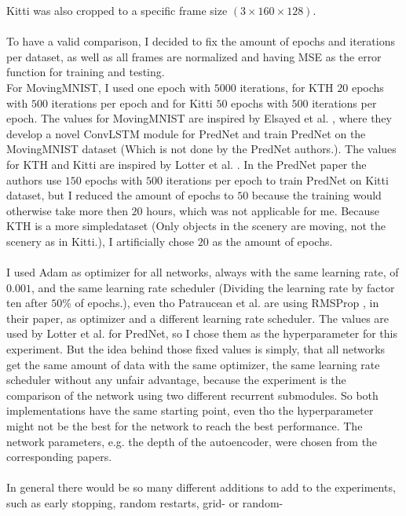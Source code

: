  Kitti was also cropped to a specific frame size $(3 \times 160 \times 128)$.\\\\
  To have a valid comparison, I decided to fix the amount of epochs and iterations per dataset, as well as all frames are normalized and having MSE as the
  error function for training and testing.\\
  For MovingMNIST, I used one epoch with $5000$ iterations, for KTH $20$ epochs with $500$ iterations per epoch and for Kitti $50$ epochs with $500$ iterations
  per epoch. The values for MovingMNIST are inspired by Elsayed et al. \cite{Elsayed2018}, where they develop a novel ConvLSTM module for PredNet and train
  PredNet on the MovingMNIST dataset (Which is not done by the PredNet authors.). The values for KTH and Kitti are inspired by Lotter et al. \cite{Lotter2016}.
  In the PredNet paper the authors use $150$ epochs with $500$ iterations per epoch to train PredNet on Kitti dataset, but I reduced the amount of epochs to
  $50$ because the training would otherwise take more then $20$ hours, which was not applicable for me. Because KTH is a more \glqq simple\grqq dataset (Only 
  objects in the scenery are moving, not the scenery as in Kitti.), I artificially chose $20$ as the amount of epochs.\\\\
  I used Adam \cite{Kingma2015} as optimizer for all networks, always with the same learning rate, of $0.001$, and the same learning rate scheduler (Dividing the 
  learning rate by factor ten after $50$\% of epochs.), even tho 
  Patraucean et al. \cite{Patraucean2015} are using RMSProp \cite{Ruder2016}, in their paper, as optimizer and a different learning rate scheduler.
  The values are used by Lotter et al. \cite{Lotter2016} for PredNet, so I chose them as the hyperparameter for this experiment.
  But the idea behind those fixed values is simply, that all networks get the same amount of data with the same optimizer, the same learning rate scheduler 
  without any unfair advantage, because the experiment is the comparison of the network using two different recurrent submodules. So both implementations
  have the same starting point, even tho the hyperparameter might not be the best for the network to reach the best performance.
  The network parameters, e.g. the depth of the autoencoder, were chosen from the corresponding papers.\\\\
  In general there would be so many different additions to add to the experiments, such as early stopping, random restarts, grid- or random-
